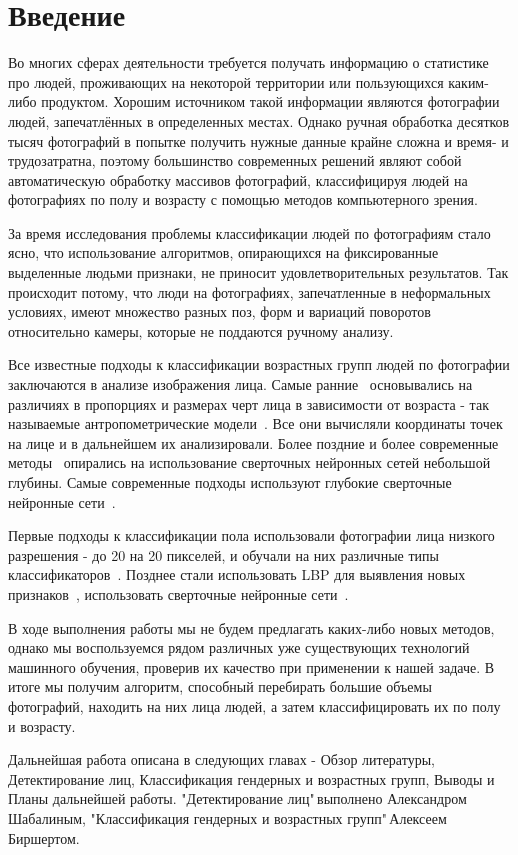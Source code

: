 \documentclass[a4paper,14pt]{extarticle}
\begin{document}
    \section{Введение}\label{sec:введение}
    Во многих сферах деятельности требуется получать информацию о статистике про людей, проживающих на некоторой территории или пользующихся каким-либо продуктом.
    Хорошим источником такой информации являются фотографии людей, запечатлённых в определенных местах.
    Однако ручная обработка десятков тысяч фотографий в попытке получить нужные данные крайне сложна и время- и трудозатратна,
    поэтому большинство современных решений являют собой автоматическую обработку массивов фотографий,
    классифицируя людей на фотографиях по полу и возрасту с помощью методов компьютерного зрения.
    \par За время исследования проблемы классификации людей по фотографиям стало ясно, что использование алгоритмов,
    опирающихся на фиксированные выделенные людьми признаки, не приносит удовлетворительных результатов.
    Так происходит потому, что люди на фотографиях, запечатленные в неформальных условиях,
    имеют множество разных поз, форм и вариаций поворотов относительно камеры, которые не поддаются ручному анализу.
    \par Все известные подходы к классификации возрастных групп людей по фотографии заключаются в анализе изображения лица.
    Самые ранние~\cite{age1994} основывались на различиях в пропорциях и размерах черт лица в зависимости от возраста -
    так называемые антропометрические модели~\cite{unfiltered}.
    Все они вычисляли координаты точек на лице и в дальнейшем их анализировали.
    Более поздние и более современные методы~\cite{hassner,INDIA} опирались на использование сверточных нейронных сетей небольшой глубины.
    Самые современные подходы используют глубокие сверточные нейронные сети~\cite{DEEP}.
    \par Первые подходы к классификации пола использовали фотографии лица низкого разрешения - до 20 на 20 пикселей,
    и обучали на них различные типы классификаторов~\cite{smoll}.
    Позднее стали использовать LBP для выявления новых признаков~\cite{lbp_age},
    использовать сверточные нейронные сети~\cite{hassner,INDIA}.
    \par В ходе выполнения работы мы не будем предлагать каких-либо новых методов,
    однако мы воспользуемся рядом различных уже существующих технологий машинного обучения,
    проверив их качество при применении к нашей задаче.
    В итоге мы получим алгоритм, способный перебирать большие объемы фотографий,
    находить на них лица людей, а затем классифицировать их по полу и возрасту.
    \par Дальнейшая работа описана в следующих главах -
    Обзор литературы, Детектирование лиц, Классификация гендерных и возрастных групп, Выводы и Планы дальнейшей работы.
    "Детектирование лиц"\,выполнено Александром Шабалиным, "Классификация гендерных и возрастных групп"\,Алексеем Биршертом.
    \newpage
\end{document}
